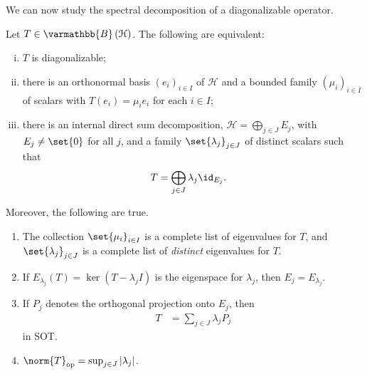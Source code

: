 \documentclass[10pt]{mypackage}
\renewcommand*{\mathbb}[1]{\varmathbb{#1}}
\newcommand{\B}{\mathbb{B}}
\begin{document}
We can now study the spectral decomposition of a diagonalizable operator.
\begin{proposition}
  Let $T\in \B\left(\mathcal{H}\right)$. The following are equivalent:
  \begin{enumerate}[(i)]
    \item $T$ is diagonalizable;
    \item there is an orthonormal basis $\left(e_i\right)_{i\in I}$ of $\mathcal{H}$ and a bounded family $\left(\mu_i\right)_{i\in I}$ of scalars with $T\left(e_i\right) = \mu_ie_i$ for each $i\in I$;
    \item there is an internal direct sum decomposition, $\mathcal{H} = \bigoplus_{j\in J}E_j$, with $E_j\neq \set{0}$ for all $j$, and a family $\set{\lambda_j}_{j\in J}$ of distinct scalars such that
      \begin{align*}
        T &= \bigoplus_{j\in J}\lambda_j\id_{E_j}.
      \end{align*}
  \end{enumerate}
  Moreover, the following are true.
  \begin{enumerate}[(1)]
    \item The collection $\set{\mu_i}_{i\in I}$ is a complete list of eigenvalues for $T$, and $\set{\lambda_j}_{j\in J}$ is a complete list of \textit{distinct} eigenvalues for $T$.
    \item If $E_{\lambda_j}\left(T\right) = \ker\left(T - \lambda_jI\right)$ is the eigenspace for $\lambda_j$, then $E_j = E_{\lambda_j}$.
    \item If $P_j$ denotes the orthogonal projection onto $E_j$, then
      \begin{align*}
        T &= \sum_{j\in J}\lambda_jP_j
      \end{align*}
      in SOT.
    \item $\norm{T}_{\text{op}} = \sup_{j\in J}\left\vert \lambda_j \right\vert$.
  \end{enumerate}
\end{proposition}
\end{document}
